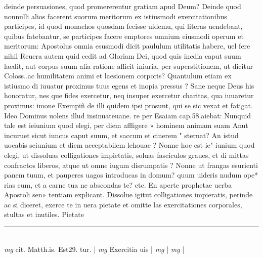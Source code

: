 \documentclass{article}
\begin{document}
\begin{pages}
deinde persuasiones, quod promererentur gratiam apud Deum? Deinde quod nonnulli alios facerent suorum meritorum ex istiusmodi exercitationibus participes, id quod monachos quosdam fecisse uidemu, qui literas uendebant, quibus fatebantur, se participes facere emptores omnium eiusmodi operum et meritorum: Apostolus omnia esusmodi dicit paululum utilitatis habere, uel fere nihil Reuera autem quid cedit ad Gloriam Dei, quod quis inedia caput suum laedit, aut corpus suum alia ratione afficit iniuria, per superstitionem, ut dicitur Coloss..ac humilitatem animi et laesionem corporis? Quantulum etiam ex istiusmo di iuuatur proximus tuus egens et inopia pressus ? Sane neque Deus his honoratur, nes que fides exercetur, neq insuper exercetur charitas, qua iuuaretur proximus: imone Exempiñ de illi quidem ipsi prosunt, qui se sic vexat et fatigat. Ideo Dominus uolens illud insinuateuane. re per Esaiam cap.58.aiebat: Nunquid tale est ieiunium quod elegi, per diem affligere » hominem animam suam Anut incuruet sicut iuncus caput suum, et saccum et cinerem " sternat? An istud uocabis seiunium et diem acceptabilem lehouae ? Nonne hoc est ie" iunium quod elegi, ut dissoluas colligationes impietatis, soluas fasciculos graues, et di  mittas confractos liberos, atque ut omne iugum disrumpatis ? Nonne ut frangas esurienti panem tuum, et pauperes uagos introducas in domum? quum uideris nudum ope* rias eum, et a carne tua ne abscondas te? etc. En aperte prophetae uerba Apostoli sen» tentiam explicant. Dissolue igitut colligationes impieratis, perinde ac si diceret, exerce te in uera pietate et omitte las exercitationes corporales, stultas et inutiles. Pietate  \pend
\vspace{0.5cm}\noindent
\vspace{0.2cm}\rule{1cm}{0.2pt}\\ 
\hspace{0.2cm}\textit{mg}
\footnotesize cit. Matth.is. Est29. tur. 
\normalsize| 
\hspace{0.2cm}\textit{mg}
\footnotesize Exercitia uis
\normalsize| 
\hspace{0.2cm}\textit{mg}
\footnotesize 
\normalsize| 
\hspace{0.2cm}\textit{mg}
\footnotesize 
\normalsize| 

\end{pages}
\end{document}
